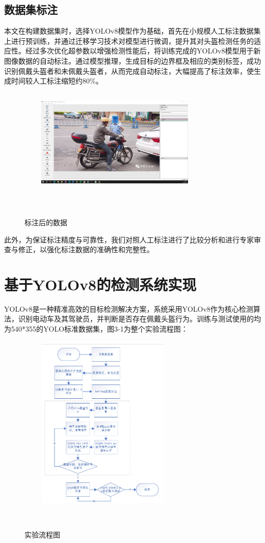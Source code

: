 \documentclass[journal]{IEEEtran}
\numberwithin{figure}{section}%
\numberwithin{table}{section}%
\numberwithin{equation}{section}
\begin{document}
\subsection{数据集标注}
本文在构建数据集时，选择YOLOv8模型作为基础，首先在小规模人工标注数据集上进行预训练，并通过迁移学习技术对模型进行微调，提升其对头盔检测任务的适应性。经过多次优化超参数以增强检测性能后，将训练完成的YOLOv8模型用于新图像数据的自动标注。通过模型推理，生成目标的边界框及相应的类别标签，成功识别佩戴头盔者和未佩戴头盔者，从而完成自动标注，大幅提高了标注效率，使生成时间较人工标注缩短约80\%。\par
\begin{figure}[htbp] 

   \centering
   \includegraphics[width=3in,height=2in]{figures/2_7.jpg}
   \caption{标注后的数据} 
   \label{fig:} 
  
\end{figure} 
此外，为保证标注精度与可靠性，我们对照人工标注进行了比较分析和进行专家审查与修正，以强化标注数据的准确性和完整性。
\setcounter{equation}{0}

\section{基于YOLOv8的检测系统实现}
YOLOv8是一种精准高效的目标检测解决方案，系统采用YOLOv8作为核心检测算法，识别电动车及其驾驶员，并判断是否存在佩戴头盔行为。训练与测试使用的均为540*355的YOLO标准数据集，图3-1为整个实验流程图：
\begin{figure}[htbp] 

   \centering
   \includegraphics[width=2.5in]{figures/流程图.png}
   \caption{实验流程图} 
   \label{fig:} 
  
\end{figure} 
\end{document}
